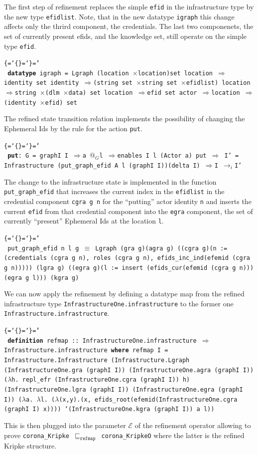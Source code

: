\documentclass{llncs}
\makeatletter
\newenvironment{ttbox}{\begin{alltt}\ttbraces\small\tt}%
                      {\end{alltt}}
\def\ttbraces{\let\.=\nobreak\chardef\{=`\{\chardef\}=`\}\chardef\|=`\\}
\newcommand\ttfun{\mbox{{$\Rightarrow$}}}
\newcommand\ttequiv{\mbox{{$\equiv$}}}
\newcommand\ttImp{\mbox{{$\Longrightarrow$}}}
\newcommand\ttlam{\mbox{\( \lambda \)}}
\newcommand\tttimes{\mbox{\( \times \)}}
\newcommand\ttatI{\mbox{\( @_G \)}}
\newcommand\ttrelI{\mbox{{$\to_{i}$}}}
\newcommand\ttref[1]{\mbox{\(\sqsubseteq_{#1}\)}}
\newcommand\ttecal{\mbox{$\mathcal{E}$}}
\newcommand\ttimg{\mbox{\texttt{`}}}
\makeatother
\begin{document}
The first step of refinement replaces the simple \texttt{efid} in the infrastructure type by the
new type \texttt{efidlist}. Note, that in the new datatype \texttt{igraph} this change affects only
the thrird component, the credentials. The last two componenets, the set of currently present efids,
and the knowledge set, still operate on the simple type \texttt{efid}.
\begin{ttbox}
{\bf datatype} igraph = 
         Lgraph (location \tttimes location)set 
                 location \ttfun identity set
                 identity \ttfun (string set \tttimes string set \tttimes efidlist)  
                 location \ttfun string \tttimes (dlm \tttimes data) set
                 location \ttfun efid set
                 actor \ttfun location \ttfun (identity \tttimes efid) set
\end{ttbox}
The refined state transition relation implements the possibility of changing the Ephemeral Ids
by the rule for the action \texttt{put}.
\begin{ttbox}
 {\bf{put}}: G = graphI I \ttImp  a \ttatI l \ttImp enables I l (Actor a) put \ttImp
      I' = Infrastructure (put_graph_efid A l (graphI I))(delta I)
 \ttImp I \ttrelI I' 
\end{ttbox}
The change to the infrastructure state is implemented in the function \texttt{put\_graph\_efid} that
increases the current index in the \texttt{efidlist} in the credential component \texttt{cgra g n} for
the ``putting'' actor identity \texttt{n} and inserts the current \texttt{efid} from that credential
component into the \texttt{egra} component, the set of currently ``present'' Ephemeral Ids at the location
\texttt{l}.
\begin{ttbox}
put_graph_efid n l g  \ttequiv
  Lgraph (gra g)(agra g)
         ((cgra g)(n := (credentials (cgra g n), roles (cgra g n),
                         efids_inc_ind(efemid (cgra g n)))))
         (lgra g)
         ((egra g)(l := insert (efids_cur(efemid (cgra g n)))(egra g l)))
         (kgra g)
\end{ttbox}
We can now apply the refinement by defining a datatype map from the refined infrastructure type
\texttt{InfrastructureOne.infrastructure} to the former one \texttt{Infrastructure.infrastructure}.
\begin{ttbox}
{\bf{definition}} refmap :: InfrastructureOne.infrastructure \ttfun
                          Infrastructure.infrastructure
{\bf{where}} refmap I =
  Infrastructure.Infrastructure 
    (Infrastructure.Lgraph
       (InfrastructureOne.gra (graphI I))
       (InfrastructureOne.agra (graphI I))
        (\ttlam h. repl_efr 
           (InfrastructureOne.cgra (graphI I)) h)
           (InfrastructureOne.lgra (graphI I))
           (InfrastructureOne.egra (graphI I))
           (\ttlam a. \ttlam l.
  (\ttlam (x,y).(x, efids_root(efemid(InfrastructureOne.cgra (graphI I) x))))
                       \ttimg(InfrastructureOne.kgra (graphI I)) a l))                                                    
\end{ttbox}  
This is then plugged into the parameter \texttt{\ttecal} of the refinement operator allowing to
prove \texttt{corona\_Kripke \ttref{\texttt{refmap}} corona\_KripkeO} where the latter is the
refined Kripke structure.
\end{document}
